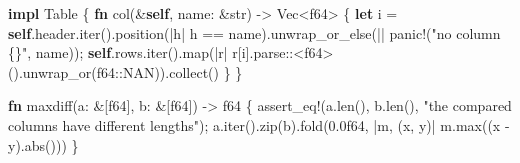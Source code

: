 \documentclass[
  10pt,
]{article}
\newenvironment{Shaded}{}{}
\newcommand{\ConstantTok}[1]{\textcolor[rgb]{0.53,0.00,0.00}{#1}}
\newcommand{\DataTypeTok}[1]{\textcolor[rgb]{0.56,0.13,0.00}{#1}}
\newcommand{\DecValTok}[1]{\textcolor[rgb]{0.25,0.63,0.44}{#1}}
\newcommand{\KeywordTok}[1]{\textcolor[rgb]{0.00,0.44,0.13}{\textbf{#1}}}
\newcommand{\NormalTok}[1]{#1}
\newcommand{\OperatorTok}[1]{\textcolor[rgb]{0.40,0.40,0.40}{#1}}
\newcommand{\PreprocessorTok}[1]{\textcolor[rgb]{0.74,0.48,0.00}{#1}}
\newcommand{\StringTok}[1]{\textcolor[rgb]{0.25,0.44,0.63}{#1}}
\begin{document}
\begin{Shaded}
\begin{Highlighting}[]
\KeywordTok{impl}\NormalTok{ Table }\OperatorTok{\{}
    \KeywordTok{fn}\NormalTok{ col(}\OperatorTok{\&}\KeywordTok{self}\OperatorTok{,}\NormalTok{ name}\OperatorTok{:} \OperatorTok{\&}\DataTypeTok{str}\NormalTok{) }\OperatorTok{{-}\textgreater{}} \DataTypeTok{Vec}\OperatorTok{\textless{}}\DataTypeTok{f64}\OperatorTok{\textgreater{}} \OperatorTok{\{}
        \KeywordTok{let}\NormalTok{ i }\OperatorTok{=} \KeywordTok{self}\OperatorTok{.}\NormalTok{header}\OperatorTok{.}\NormalTok{iter()}\OperatorTok{.}\NormalTok{position(}\OperatorTok{|}\NormalTok{h}\OperatorTok{|}\NormalTok{ h }\OperatorTok{==}\NormalTok{ name)}\OperatorTok{.}\NormalTok{unwrap\_or\_else(}\OperatorTok{||} \PreprocessorTok{panic!}\NormalTok{(}\StringTok{"no column \{\}"}\OperatorTok{,}\NormalTok{ name))}\OperatorTok{;}
        \KeywordTok{self}\OperatorTok{.}\NormalTok{rows}\OperatorTok{.}\NormalTok{iter()}\OperatorTok{.}\NormalTok{map(}\OperatorTok{|}\NormalTok{r}\OperatorTok{|}\NormalTok{ r[i]}\OperatorTok{.}\PreprocessorTok{parse::}\OperatorTok{\textless{}}\DataTypeTok{f64}\OperatorTok{\textgreater{}}\NormalTok{()}\OperatorTok{.}\NormalTok{unwrap\_or(}\DataTypeTok{f64}\PreprocessorTok{::}\ConstantTok{NAN}\NormalTok{))}\OperatorTok{.}\NormalTok{collect()}
    \OperatorTok{\}}
\OperatorTok{\}}

\KeywordTok{fn}\NormalTok{ maxdiff(a}\OperatorTok{:} \OperatorTok{\&}\NormalTok{[}\DataTypeTok{f64}\NormalTok{]}\OperatorTok{,}\NormalTok{ b}\OperatorTok{:} \OperatorTok{\&}\NormalTok{[}\DataTypeTok{f64}\NormalTok{]) }\OperatorTok{{-}\textgreater{}} \DataTypeTok{f64} \OperatorTok{\{}
    \PreprocessorTok{assert\_eq!}\NormalTok{(a}\OperatorTok{.}\NormalTok{len()}\OperatorTok{,}\NormalTok{ b}\OperatorTok{.}\NormalTok{len()}\OperatorTok{,} \StringTok{"the compared columns have different lengths"}\NormalTok{)}\OperatorTok{;}
\NormalTok{    a}\OperatorTok{.}\NormalTok{iter()}\OperatorTok{.}\NormalTok{zip(b)}\OperatorTok{.}\NormalTok{fold(}\DecValTok{0.0f64}\OperatorTok{,} \OperatorTok{|}\NormalTok{m}\OperatorTok{,}\NormalTok{ (x}\OperatorTok{,}\NormalTok{ y)}\OperatorTok{|}\NormalTok{ m}\OperatorTok{.}\NormalTok{max((x }\OperatorTok{{-}}\NormalTok{ y)}\OperatorTok{.}\NormalTok{abs()))}
\OperatorTok{\}}


\end{Highlighting}
\end{Shaded}
\end{document}
